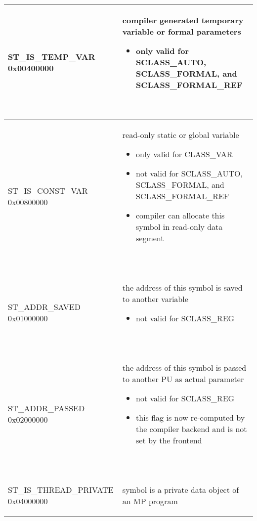 \begin{longtable}{|p{2in}|p{4in}|}
\index{ST\_IS\_TEMP\_VAR}%
ST\_IS\_TEMP\_VAR 0x00400000 &
\begin{minipage}{4in}
\flushleft
compiler generated temporary variable or formal parameters
\begin{itemize}
\item only valid for SCLASS\_AUTO, SCLASS\_FORMAL, and
\index{SCLASS\_FORMAL\_REF}%
SCLASS\_FORMAL\_REF
\end{itemize}
~
\end{minipage}\\\hline
\index{ST\_IS\_CONST\_VAR}%
ST\_IS\_CONST\_VAR  0x00800000 & 
\begin{minipage}{4in}
\flushleft
read-only static or global variable 
\begin{itemize}
\item only valid for
\index{CLASS\_VAR}%
CLASS\_VAR
\item  not valid for SCLASS\_AUTO, SCLASS\_FORMAL, and
\index{SCLASS\_FORMAL\_REF}%
 SCLASS\_FORMAL\_REF
\item  compiler can allocate this symbol in read-only data segment
\end{itemize}
~
\end{minipage}\\\hline
\index{ST\_ADDR\_SAVED}%
ST\_ADDR\_SAVED 0x01000000 & 
\begin{minipage}{3.5in}
the address of this symbol is saved to
another variable
\begin{itemize}
\item not valid for SCLASS\_REG
\end{itemize}
~
\end{minipage}\\\hline
\index{ST\_ADDR\_PASSED}%
ST\_ADDR\_PASSED 0x02000000 & 
\begin{minipage}{3.5in}
the address of this symbol is passed to
another
\index{PU}%
PU as actual parameter
\begin{itemize}

\item not valid for SCLASS\_REG
\item this flag is now re-computed by the compiler backend and
is not set by the frontend 
\end{itemize}
~
\end{minipage}\\\hline

\index{ST\_IS\_THREAD\_PRIVATE}%
ST\_IS\_THREAD\_PRIVATE 0x04000000 & 
\begin{minipage}{3.5in}
symbol is a private data object
of an MP program
\begin{itemize}


\end{itemize}
\end{minipage}
\end{longtable}
